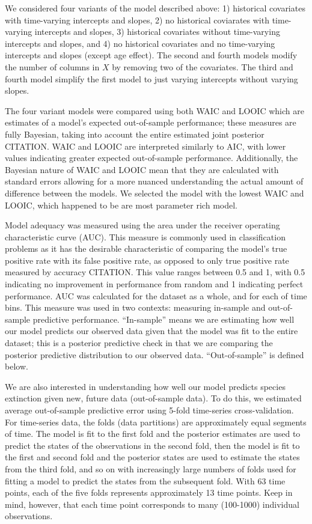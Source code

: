 \documentclass[12pt,letterpaper]{article}
\begin{document}
We considered four variants of the model described above: 1) historical covariates with time-varying intercepts and slopes, 2) no historical coviarates with time-varying intercepts and slopes, 3) historical covariates without time-varying intercepts and slopes, and 4) no historical covariates and no time-varying intercepts and slopes (except age effect). The second and fourth models modify the number of columns in \(X\) by removing two of the covariates. The third and fourth model simplify the first model to just varying intercepts without varying slopes.

The four variant models were compared using both WAIC and LOOIC which are estimates of a model's expected out-of-sample performance; these measures are fully Bayesian, taking into account the entire estimated joint posterior CITATION. WAIC and LOOIC are interpreted similarly to AIC, with lower values indicating greater expected out-of-sample performance. Additionally, the Bayesian nature of WAIC and LOOIC mean that they are calculated with standard errors allowing for a more nuanced understanding the actual amount of difference between the models. We selected the model with the lowest WAIC and LOOIC, which happened to be are most parameter rich model.

Model adequacy was measured using the area under the receiver operating characteristic curve (AUC). This measure is commonly used in classification problems as it has the desirable characteristic of comparing the model's true positive rate with its false positive rate, as opposed to only true positive rate measured by accuracy CITATION. This value ranges between 0.5 and 1, with 0.5 indicating no improvement in performance from random and 1 indicating perfect performance. AUC was calculated for the dataset as a whole, and for each of time bins. This measure was used in two contexts: measuring in-sample and out-of-sample predictive performance. ``In-sample'' means we are estimating how well our model predicts our observed data given that the model was fit to the entire dataset; this is a posterior predictive check in that we are comparing the posterior predictive distribution to our observed data. ``Out-of-sample'' is defined below.

We are also interested in understanding how well our model predicts species extinction given new, future data (out-of-sample data). To do this, we estimated average out-of-sample predictive error using 5-fold time-series cross-validation. For time-series data, the folds (data partitions) are approximately equal segments of time. The model is fit to the first fold and the posterior estimates are used to predict the states of the observations in the second fold, then the model is fit to the first and second fold and the posterior states are used to estimate the states from the third fold, and so on with increasingly large numbers of folds used for fitting a model to predict the states from the subsequent fold. With 63 time points, each of the five folds represents approximately 13 time points. Keep in mind, however, that each time point corresponds to many (100-1000) individual observations.
\end{document}
